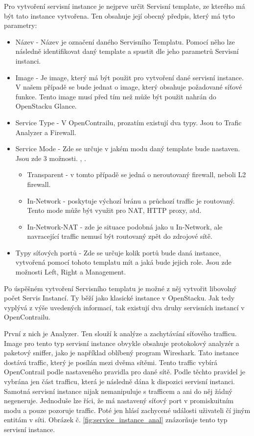 Pro vytvoření servisní instance je nejprve určit Servisní template, ze kterého má být tato instance vytvořena. Ten obsahuje její obecný předpis, který má tyto parametry:

\begin{itemize}
\item Název - Název je označení daného Servisního Templatu. Pomocí něho lze následně identifikovat daný template a spustit dle jeho parametrů Servisní instanci. 
\item Image - Je image, který má být použit pro vytvoření dané servisní instance. V našem případě se bude jednat o image, který obsahuje požadované síťové funkce. Tento image musí před tím než může být použit  nahrán do OpenStacku Glance.
\item Service Type - V OpenContrailu, prozatím existují dva typy. Jsou to Trafic Analyzer a Firewall.
\item Service Mode - Zde se určuje v jakém modu daný template bude nastaven. Jsou zde 3 možnosti. , .

  \begin{itemize}
  \item Transparent - v tomto případě se jedná o neroutovaný firewall, neboli L2 firewall.
  \item In-Network - poskytuje výchozí bránu a průchozí traffic je routovaný. Tento mode může být využit pro NAT, HTTP proxy, atd.
  \item In-Network-NAT - zde je situace podobná jako u In-Network, ale navracející traffic nemusí být routovaný zpět do zdrojové sítě.
  \end{itemize}

\item Typy síťových portů - Zde se určuje kolik portů bude daná instance, vytvořená pomocí tohoto templatu mít a jaká bude jejich role. Jsou zde možnosti Left, Right a Management. 
\end{itemize}

Po úspěšném vytvoření Servisního templatu je možné z něj vytvořit libovolný počet Servis Instancí. Ty běží jako klasické instance v OpenStacku. Jak tedy vyplývá z výše uvedených informací, tak existují dva druhy servisních instancí v OpenContrailu. 

První z nich je Analyzer. Ten slouží k analýze a zachytávání síťového trafficu. Image pro tento typ servisní instance obvykle obsahuje protokolový analyzér a paketový sniffer, jako je například oblíbený program Wireshark. Tato instance dostává traffic, který je posílán mezi dvěma sítěmi. Tento traffic vybírá OpenContrail podle nastaveného pravidla pro dané sítě. Podle těchto pravidel je vybrána jen část trafficu, která je následně dána k dispozici servisní instanci. Samotná servisní instance nijak nemanipuluje s trafficem a ani do něj žádný negeneruje. Jednoduše lze říci, že má nastavený síťový port v promiskuitním modu a pouze pozoruje traffic. Poté jen hlásí zachycené události uživateli čí jiným entitám v síti. Obrázek č. \ref{fig:service_instance_anal} znázorňuje tento typ servisní instance.

